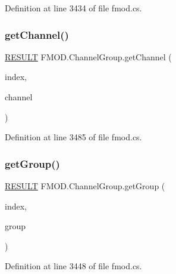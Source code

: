 Definition at line 3434 of file fmod.\+cs.

\mbox{\label{class_f_m_o_d_1_1_channel_group_a6cca9c6376b7c588821b8e75c3e072cf}} 
\subsubsection{\texorpdfstring{get\+Channel()}{getChannel()}}
{\footnotesize\ttfamily \hyperlink{namespace_f_m_o_d_a305d1176ef3f8c8815861a60407ac33d}{R\+E\+S\+U\+LT} F\+M\+O\+D.\+Channel\+Group.\+get\+Channel (\begin{DoxyParamCaption}\item[{int}]{index,  }\item[{out \hyperlink{class_f_m_o_d_1_1_channel}{Channel}}]{channel }\end{DoxyParamCaption})}



Definition at line 3485 of file fmod.\+cs.

\mbox{\label{class_f_m_o_d_1_1_channel_group_ab2f0df58a7dd8d82ee263c806584ee1f}} 
\subsubsection{\texorpdfstring{get\+Group()}{getGroup()}}
{\footnotesize\ttfamily \hyperlink{namespace_f_m_o_d_a305d1176ef3f8c8815861a60407ac33d}{R\+E\+S\+U\+LT} F\+M\+O\+D.\+Channel\+Group.\+get\+Group (\begin{DoxyParamCaption}\item[{int}]{index,  }\item[{out \hyperlink{class_f_m_o_d_1_1_channel_group}{Channel\+Group}}]{group }\end{DoxyParamCaption})}



Definition at line 3448 of file fmod.\+cs.

\mbox{\label{class_f_m_o_d_1_1_channel_group_a30ba57fae8c8708f90da9d4de9f36336}} 

